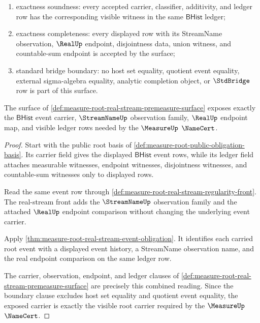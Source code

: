 \begin{definition}
\begin{enumerate}
  \item exactness soundness: every accepted carrier, classifier, additivity,
  and ledger row has the corresponding visible witness in the same
  $\mathsf{BHist}$ ledger;
  \item exactness completeness: every displayed row with its StreamName
  observation, $\RealUp$ endpoint, disjointness data, union witness, and
  countable-sum endpoint is accepted by the surface;
  \item standard bridge boundary: no host set equality, quotient event
  equality, external sigma-algebra equality, analytic completion object, or
  $\StdBridge$ row is part of this surface.
\end{enumerate}
\end{definition}

\begin{theorem}
\label{thm:measure-root-real-stream-premeasure-carrier-obligation}
The surface of
\autoref{def:measure-root-real-stream-premeasure-surface} exposes exactly the
$\mathsf{BHist}$ event carrier, $\StreamNameUp$ observation family,
$\RealUp$ endpoint map, and visible ledger rows needed by the $\MeasureUp$
$\NameCert$.
\end{theorem}
\begin{proof}
Start with the public root basis of
\autoref{def:measure-root-public-obligation-basis}. Its carrier field gives
the displayed $\mathsf{BHist}$ event rows, while its ledger field attaches
measurable witnesses, endpoint witnesses, disjointness witnesses, and
countable-sum witnesses only to displayed rows.

Read the same event row through
\autoref{def:measure-root-real-stream-regularity-front}. The real-stream front
adds the $\StreamNameUp$ observation family and the attached $\RealUp$
endpoint comparison without changing the underlying event carrier.

Apply \autoref{thm:measure-root-real-stream-event-obligation}. It identifies
each carried root event with a displayed event history, a StreamName
observation name, and the real endpoint comparison on the same ledger row.

The carrier, observation, endpoint, and ledger clauses of
\autoref{def:measure-root-real-stream-premeasure-surface} are precisely this
combined reading. Since the boundary clause excludes host set equality and
quotient event equality, the exposed carrier is exactly the visible root
carrier required by the $\MeasureUp$ $\NameCert$.
\end{proof}

